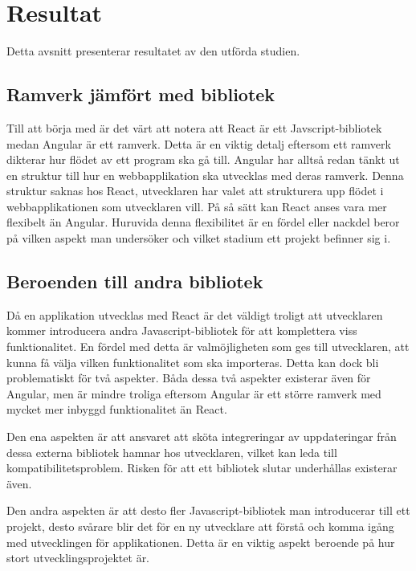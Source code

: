 \section{Resultat}
\label{sec:axel-results}
Detta avsnitt presenterar resultatet av den utförda studien.

\subsection{Ramverk jämfört med bibliotek}
Till att börja med är det värt att notera att React är ett Javscript-bibliotek medan Angular är ett ramverk. Detta är en viktig detalj eftersom ett ramverk dikterar hur flödet av ett program ska gå till. Angular har alltså redan tänkt ut en struktur till hur en webbapplikation ska utvecklas med deras ramverk. Denna struktur saknas hos React, utvecklaren har valet att strukturera upp flödet i webbapplikationen som utvecklaren vill. På så sätt kan React anses vara mer flexibelt än Angular. Huruvida denna flexibilitet är en fördel eller nackdel beror på vilken aspekt man undersöker och vilket stadium ett projekt befinner sig i. 

\subsection{Beroenden till andra bibliotek}
Då en applikation utvecklas med React är det väldigt troligt att utvecklaren kommer introducera andra Javascript-bibliotek för att komplettera viss funktionalitet. En fördel med detta är valmöjligheten som ges till utvecklaren, att kunna få välja vilken funktionalitet som ska importeras. Detta kan dock bli problematiskt för två aspekter. Båda dessa två aspekter existerar även för Angular, men är mindre troliga eftersom Angular är ett större ramverk med mycket mer inbyggd funktionalitet än React.

Den ena aspekten är att ansvaret att sköta integreringar av uppdateringar från dessa externa bibliotek hamnar hos utvecklaren, vilket kan leda till kompatibilitetsproblem. Risken för att ett bibliotek slutar underhållas existerar även.

Den andra aspekten är att desto fler Javascript-bibliotek man introducerar till ett projekt, desto svårare blir det för en ny utvecklare att förstå och komma igång med utvecklingen för applikationen. Detta är en viktig aspekt beroende på hur stort utvecklingsprojektet är.


